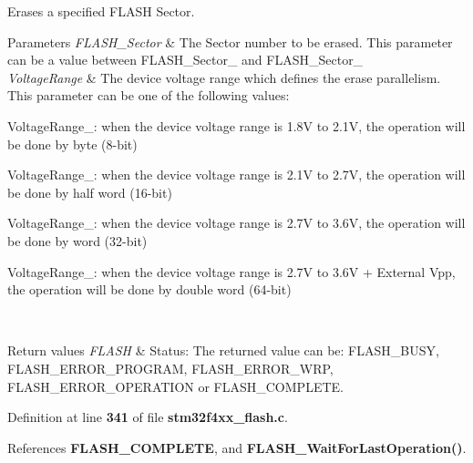 Erases a specified F\+L\+A\+SH Sector. 


\begin{DoxyParams}{Parameters}
{\em F\+L\+A\+S\+H\+\_\+\+Sector} & The Sector number to be erased. This parameter can be a value between F\+L\+A\+S\+H\+\_\+\+Sector\+\_ and F\+L\+A\+S\+H\+\_\+\+Sector\+\_\\
\hline
{\em Voltage\+Range} & The device voltage range which defines the erase parallelism. This parameter can be one of the following values\+: \begin{DoxyItemize}
\item Voltage\+Range\+\_\+: when the device voltage range is 1.\+8V to 2.\+1V, the operation will be done by byte (8-\/bit) \item Voltage\+Range\+\_\+: when the device voltage range is 2.\+1V to 2.\+7V, the operation will be done by half word (16-\/bit) \item Voltage\+Range\+\_\+: when the device voltage range is 2.\+7V to 3.\+6V, the operation will be done by word (32-\/bit) \item Voltage\+Range\+\_\+: when the device voltage range is 2.\+7V to 3.\+6V + External Vpp, the operation will be done by double word (64-\/bit)\end{DoxyItemize}
\\
\hline
\end{DoxyParams}

\begin{DoxyRetVals}{Return values}
{\em F\+L\+A\+SH} & Status\+: The returned value can be\+: F\+L\+A\+S\+H\+\_\+\+B\+U\+SY, F\+L\+A\+S\+H\+\_\+\+E\+R\+R\+O\+R\+\_\+\+P\+R\+O\+G\+R\+AM, F\+L\+A\+S\+H\+\_\+\+E\+R\+R\+O\+R\+\_\+\+W\+RP, F\+L\+A\+S\+H\+\_\+\+E\+R\+R\+O\+R\+\_\+\+O\+P\+E\+R\+A\+T\+I\+ON or F\+L\+A\+S\+H\+\_\+\+C\+O\+M\+P\+L\+E\+TE. \\
\hline
\end{DoxyRetVals}


Definition at line \textbf{ 341} of file \textbf{ stm32f4xx\+\_\+flash.\+c}.



References \textbf{ F\+L\+A\+S\+H\+\_\+\+C\+O\+M\+P\+L\+E\+TE}, and \textbf{ F\+L\+A\+S\+H\+\_\+\+Wait\+For\+Last\+Operation()}.


